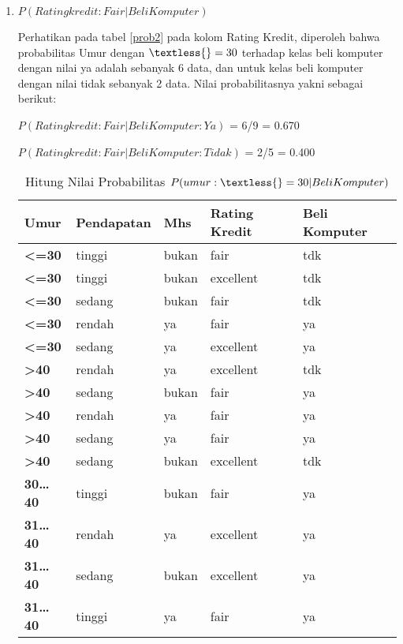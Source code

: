 \begin{enumerate}
\item $P(Ratingkredit:Fair|Beli Komputer)$
\par Perhatikan pada tabel \ref{prob2} pada kolom Rating Kredit, diperoleh bahwa probabilitas Umur dengan $\textless{}=30$ terhadap kelas beli komputer dengan nilai ya adalah sebanyak 6 data, dan untuk kelas beli komputer dengan nilai tidak sebanyak 2 data. Nilai probabilitasnya yakni sebagai berikut:
\par $P(Ratingkredit:Fair|Beli Komputer:Ya)$ = 6/9	=  0.670
\par $P(Ratingkredit:Fair|Beli Komputer:Tidak)$ = 2/5  =  0.400
    \begin{table}[!ht]
    \centering
    \caption{Hitung Nilai Probabilitas $P(umur :\textless{}=30|Beli Komputer)$ }
    \label{prob1}
\begin{tabular}{|l|l|l|l|l|}
\hline
\textbf{Umur}             & Pendapatan & Mhs   & Rating Kredit & Beli Komputer \\ \hline
\textbf{\textless{}=30}   & tinggi     & bukan & fair          & tdk           \\ \hline
\textbf{\textless{}=30}   & tinggi     & bukan & excellent     & tdk           \\ \hline
\textbf{\textless{}=30}   & sedang     & bukan & fair          & tdk           \\ \hline
\textbf{\textless{}=30}   & rendah     & ya    & fair          & ya            \\ \hline
\textbf{\textless{}=30}   & sedang     & ya    & excellent     & ya            \\ \hline
\textbf{\textgreater{}40} & rendah     & ya    & excellent     & tdk           \\ \hline
\textbf{\textgreater{}40} & sedang     & bukan & fair          & ya            \\ \hline
\textbf{\textgreater{}40} & rendah     & ya    & fair          & ya            \\ \hline
\textbf{\textgreater{}40} & sedang     & ya    & fair          & ya            \\ \hline
\textbf{\textgreater{}40} & sedang     & bukan & excellent     & tdk           \\ \hline
\textbf{30…40}            & tinggi     & bukan & fair          & ya            \\ \hline
\textbf{31…40}            & rendah     & ya    & excellent     & ya            \\ \hline
\textbf{31…40}            & sedang     & bukan & excellent     & ya            \\ \hline
\textbf{31…40}            & tinggi     & ya    & fair          & ya            \\ \hline
\end{tabular}
\end{table}




\end{enumerate}

